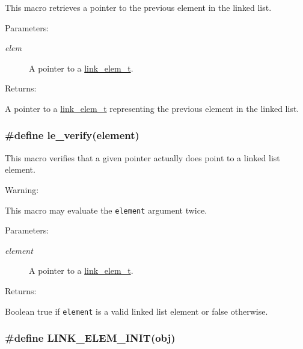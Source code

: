 This macro retrieves a pointer to the previous element in the linked list.\begin{Desc}
\item[Parameters: ]\par
\begin{description}
\item[{\em 
elem}]A pointer to a \hyperlink{group__dbprim__link_a1}{link\_\-elem\_\-t}.\end{description}
\end{Desc}
\begin{Desc}
\item[Returns: ]\par
A pointer to a \hyperlink{group__dbprim__link_a1}{link\_\-elem\_\-t} representing the previous element in the linked list. \end{Desc}
\hypertarget{group__dbprim__link_a20}{
\subsubsection[le\_\-verify]{\setlength{\rightskip}{0pt plus 5cm}\#define le\_\-verify(element)}}
\label{group__dbprim__link_a20}


This macro verifies that a given pointer actually does point to a linked list element.

\begin{Desc}
\item[Warning: ]\par
This macro may evaluate the {\tt element} argument twice.\end{Desc}
\begin{Desc}
\item[Parameters: ]\par
\begin{description}
\item[{\em 
element}]A pointer to a \hyperlink{group__dbprim__link_a1}{link\_\-elem\_\-t}.\end{description}
\end{Desc}
\begin{Desc}
\item[Returns: ]\par
Boolean true if {\tt element} is a valid linked list element or false otherwise. \end{Desc}
\hypertarget{group__dbprim__link_a19}{
\subsubsection[LINK\_\-ELEM\_\-INIT]{\setlength{\rightskip}{0pt plus 5cm}\#define LINK\_\-ELEM\_\-INIT(obj)}}
\label{group__dbprim__link_a19}


